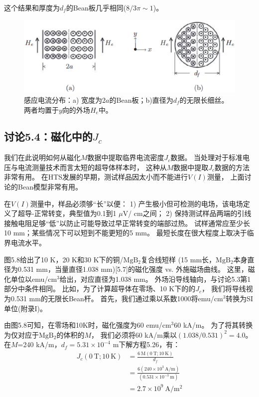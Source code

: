 这个结果和厚度为$d_f$的Bean板几乎相同($8/3\pi \sim 1$)。

\begin{figure}[htbp]
	\centering
	\includegraphics[scale=0.5]{chpt5/figs/fig5.16.eps}
	\caption{感应电流分布：a) 宽度为$2a$的Bean板；b)直径为$d_f$的无限长细丝。两者均置于$y$向的外场$H_e$中。}
\end{figure}

\subsection{讨论5.4：磁化中的$J_c$}
我们在此说明如何从​​磁化$M$数据中提取临界电流密度$J_c$数据。
当处理对于标准电压与电流测量技术而言太短的超导体样本时，
这种从$M$数据中提取$J_c$数据的方法非常有用。
在HTS发展的早期，测试样品因太小而不能进行$V(I)$测量，
上面讨论的Bean模型非常有用。

在$V(I)$测量中，样品必须够“长”以便：
1) 产生极小但可检测的电场，该电场定义了超导-正常转变，典型值为0.1到1 $\mu$V/ cm之间；
2) 保持测试样品两端的引线接触电阻足够“低”以防止可能导致过早正常转变的端部过热。
试样通常应至少长10 mm；某些情况下可以短到不能更短的5 mm。
最短长度在很大程度上取决于临界电流水平。

图5.8给出了10 K，20 K和30 K下的铜/$\mathrm{MgB_2}$复合线短样
(15 mm长，$\mathrm{MgB_2}$本身直径为0.531 mm，当量直径1.038 mm)[5.7]的磁化强度 vs. 外施磁场曲线。
这里，磁化单位以emu/$\mathrm{cm^3}$给出，对应直径为1.038 mm。
外场沿导线轴向，与讨论5.3第1部分中条件相同。
比如，为了计算超导体在零场、10 K下的的$J_c$，
我们将导线视为0.531 mm的无限长Bean杆。
首先，我们通过乘以系数1000将emu/$\mathrm{cm^3}$转换为SI单位(附录I)。

由图5.8可知，在零场和10K时，磁化强度为60 emu/$\mathrm{cm^3}$60 kA/m。
为了将其转换为仅对应于$\mathrm{MgB_2}$的体积的$M$，
我们必须将60 kA/m乘以$(1.038/0.531)^2 = 4.0$。
在$M$=240 kA/m，$d_f = 5.31\times10^{-4}$ m下解方程5.26，有：
\begin{align*}%
J_{c}(0\ \mathrm{T};10\ \mathrm{K})&=\frac{6\ \mathrm{M}(0\ \mathrm{T};10\ \mathrm{K})}{d_{f}}\\
&=\frac{6(240\times10^{3}\ \mathrm{A/m})}{(0.531\times10^{-3}\ \mathrm{m})}\\
&=2.7\times10^{9}\ \mathrm{A/m^{2}}
\end{align*}


